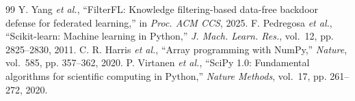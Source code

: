 \begin{thebibliography}{99}
 Y. Yang \emph{et al.}, ``FilterFL: Knowledge filtering-based data-free backdoor defense for federated learning,'' in \emph{Proc. ACM CCS}, 2025.
 F. Pedregosa \emph{et al.}, ``Scikit-learn: Machine learning in Python,'' \emph{J. Mach. Learn. Res.}, vol.~12, pp. 2825--2830, 2011.
 C. R. Harris \emph{et al.}, ``Array programming with NumPy,'' \emph{Nature}, vol.~585, pp. 357--362, 2020.
 P. Virtanen \emph{et al.}, ``SciPy 1.0: Fundamental algorithms for scientific computing in Python,'' \emph{Nature Methods}, vol.~17, pp. 261--272, 2020.
\end{thebibliography}
